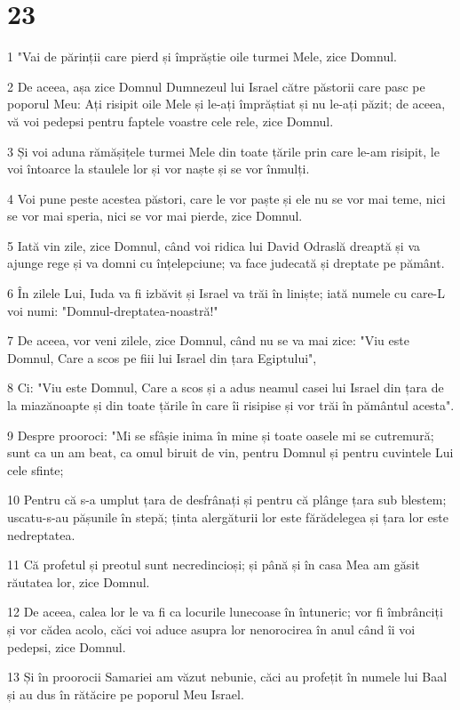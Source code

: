 \chapter{23}

\par 1 "Vai de părinții care pierd și împrăștie oile turmei Mele, zice Domnul.
\par 2 De aceea, așa zice Domnul Dumnezeul lui Israel către păstorii care pasc pe poporul Meu: Ați risipit oile Mele și le-ați împrăștiat și nu le-ați păzit; de aceea, vă voi pedepsi pentru faptele voastre cele rele, zice Domnul.
\par 3 Și voi aduna rămășițele turmei Mele din toate țările prin care le-am risipit, le voi întoarce la staulele lor și vor naște și se vor înmulți.
\par 4 Voi pune peste acestea păstori, care le vor paște și ele nu se vor mai teme, nici se vor mai speria, nici se vor mai pierde, zice Domnul.
\par 5 Iată vin zile, zice Domnul, când voi ridica lui David Odraslă dreaptă și va ajunge rege și va domni cu înțelepciune; va face judecată și dreptate pe pământ.
\par 6 În zilele Lui, Iuda va fi izbăvit și Israel va trăi în liniște; iată numele cu care-L voi numi: "Domnul-dreptatea-noastră!"
\par 7 De aceea, vor veni zilele, zice Domnul, când nu se va mai zice: "Viu este Domnul, Care a scos pe fiii lui Israel din țara Egiptului",
\par 8 Ci: "Viu este Domnul, Care a scos și a adus neamul casei lui Israel din țara de la miazănoapte și din toate țările în care îi risipise și vor trăi în pământul acesta".
\par 9 Despre prooroci: "Mi se sfâșie inima în mine și toate oasele mi se cutremură; sunt ca un am beat, ca omul biruit de vin, pentru Domnul și pentru cuvintele Lui cele sfinte;
\par 10 Pentru că s-a umplut țara de desfrânați și pentru că plânge țara sub blestem; uscatu-s-au pășunile în stepă; ținta alergăturii lor este fărădelegea și țara lor este nedreptatea.
\par 11 Că profetul și preotul sunt necredincioși; și până și în casa Mea am găsit răutatea lor, zice Domnul.
\par 12 De aceea, calea lor le va fi ca locurile lunecoase în întuneric; vor fi îmbrânciți și vor cădea acolo, căci voi aduce asupra lor nenorocirea în anul când îi voi pedepsi, zice Domnul.
\par 13 Și în proorocii Samariei am văzut nebunie, căci au profețit în numele lui Baal și au dus în rătăcire pe poporul Meu Israel.
